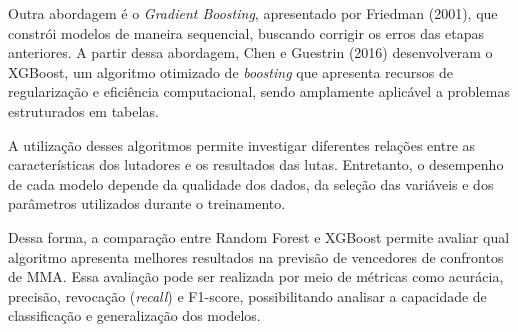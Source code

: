 \documentclass[12pt,a4paper]{report}
\begin{document}
Outra abordagem é o \textit{Gradient Boosting}, apresentado por Friedman (2001), que constrói modelos de maneira sequencial, buscando corrigir os erros das etapas anteriores. A partir dessa abordagem, Chen e Guestrin (2016) desenvolveram o XGBoost, um algoritmo otimizado de \textit{boosting} que apresenta recursos de regularização e eficiência computacional, sendo amplamente aplicável a problemas estruturados em tabelas.

A utilização desses algoritmos permite investigar diferentes relações entre as características dos lutadores e os resultados das lutas. Entretanto, o desempenho de cada modelo depende da qualidade dos dados, da seleção das variáveis e dos parâmetros utilizados durante o treinamento.

Dessa forma, a comparação entre Random Forest e XGBoost permite avaliar qual algoritmo apresenta melhores resultados na previsão de vencedores de confrontos de MMA. Essa avaliação pode ser realizada por meio de métricas como acurácia, precisão, revocação (\textit{recall}) e F1-score, possibilitando analisar a capacidade de classificação e generalização dos modelos.
\end{document}
